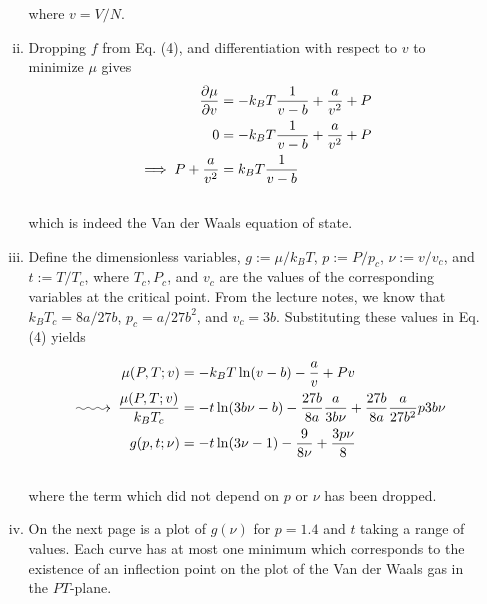 \documentclass[]{article}
\makeatletter
\newcommand{\longsquiggly}{\xymatrix{{}\ar@{~>}[r]&{}}}
\makeatother
\begin{document}
\begin{enumerate}[1.]
\begin{enumerate}[i.]
where $v = V/N$.  \\


\item Dropping $f$ from Eq. (4), and differentiation with respect to $v$ to minimize $\mu$ gives \\

\begin{equation}
\begin{aligned}
\pdv{ \mu }{ v} & = -  k_B T\frac{1}{  v - b } + \frac{ a }{v^2}  + P  \\
0 & = -  k_B T\frac{1}{  v - b } + \frac{ a }{v^2}  + P  \\
\implies P + \frac{ a }{v^2} & =  k_B T\frac{1}{  v - b } \\
\end{aligned}
\end{equation} \\

which is indeed the Van der Waals equation of state. \\


\item Define the dimensionless variables, $g := \mu /k_B T$, $p := P/p_c$, $\nu := v/v_c$, and $t := T/T_c$, where $T_c, P_c$, and $v_c$ are the values of the corresponding variables at the critical point. From the lecture notes, we know that $k_B T_c = 8a/27b$, $p_c = a/27b^2$, and $v_c = 3b$. Substituting these values in Eq. (4) yields

\begin{equation}
\begin{aligned}
\mu (P, T ; v)  & = -  k_B T \ln( v - b ) - \frac{ a }{v}  + Pv   \\
\longsquiggly \frac{ \mu (P, T ; v)    }{ k_B T_c } & = - t \ln( 3b \nu - b ) - \frac{  27 b  }{ 8a  } \frac{ a }{ 3b \nu }  + \frac{  27 b  }{ 8a  }  \frac{ a  }{ 27 b^2  }  p 3b \nu \\
g( p , t; \nu) & = - t \ln( 3 \nu - 1 ) - \frac{  9   }{ 8 \nu  } + \frac{ 3 p \nu  }{ 8  }   \\
\end{aligned}
\end{equation} \\

where the term which did not depend on $p$ or $\nu$ has been dropped. \\

\item On the next page is a plot of $g(\nu)$ for $p = 1.4$ and $t$ taking a range of values. Each curve has at most one minimum which corresponds to the existence of an inflection point on the plot of the Van der Waals gas in the $PT$-plane. \\


\end{enumerate}
\end{enumerate}
\end{document}
